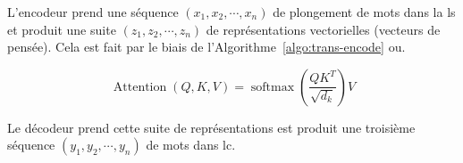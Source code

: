 L'encodeur prend une séquence \((x_1, x_2, \cdots, x_n)\) de plongement de mots dans la \Acrshort{ls} 
et produit une suite \((z_1, z_2, \cdots, z_n)\) de représentations vectorielles (vecteurs de pensée).
Cela est fait par le biais de l'Algorithme~\ref{algo:trans-encode} ou.

\[
    \operatorname{Attention}(Q, K, V)=\operatorname{softmax}\left(\frac{Q K^T}{\sqrt{d_k}}\right) V
\]
    
    

% 

Le décodeur prend cette suite de représentations est produit une troisième séquence 
\((y_1, y_2, \cdots, y_n)\)
de mots dans \acrshort{lc}.
